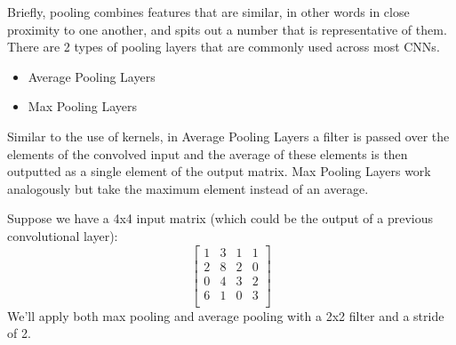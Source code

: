 Briefly, pooling combines features that are similar, in other words in close proximity to one another, and spits out a number that is representative of them. There are 2 types of pooling layers that are commonly used across most CNNs.

\begin{itemize}
    \item Average Pooling Layers
    \item Max Pooling Layers
\end{itemize}

Similar to the use of kernels, in Average Pooling Layers a filter is passed over the elements of the convolved input and the average of these elements is then outputted as a single element of the output matrix. Max Pooling Layers work analogously but take the maximum element instead of an average.

Suppose we have a 4x4 input matrix (which could be the output of a previous convolutional layer):
\[
\begin{bmatrix}
1 & 3 & 1 & 1 \\
2 & 8 & 2 & 0 \\
0 & 4 & 3 & 2 \\
6 & 1 & 0 & 3 \\
\end{bmatrix}
\]
We'll apply both max pooling and average pooling with a 2x2 filter and a stride of 2.

